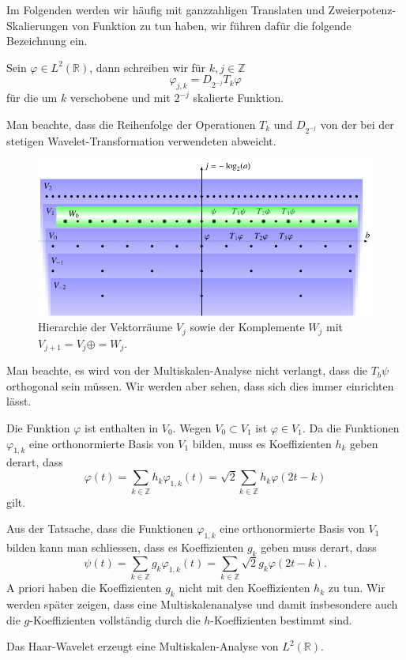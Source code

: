 Im Folgenden werden wir häufig mit ganzzahligen Translaten und
Zweierpotenz-Skalierungen von Funktion zu tun haben, wir führen dafür
die folgende Bezeichnung ein.

\begin{definition}
Sein $\varphi\in L^2(\mathbb R)$, dann schreiben wir für $k,j\in \mathbb Z$
\[
\varphi_{j,k} = D_{2^{-j}}T_k\varphi
\]
für die um $k$ verschobene und mit $2^{-j}$ skalierte Funktion.
\end{definition}

Man beachte, dass die Reihenfolge der Operationen $T_k$ und $D_{2^{-j}}$
von der bei der stetigen Wavelet-Transformation verwendeten abweicht.

\begin{figure}
\centering
\includegraphics{chapters/6-msa/images/msa.pdf}
\caption{Hierarchie der Vektorräume $V_j$ sowie der Komplemente $W_j$
mit
$V_{j+1} = V_j \oplus = W_j$.
\label{msa:vektorraumhierarchie}}
\end{figure}

Man beachte, es wird von der Multiskalen-Analyse nicht verlangt, dass 
die $T_b\psi$ orthogonal sein müssen.
Wir werden aber sehen, dass sich dies immer einrichten lässt.

Die Funktion $\varphi$ ist enthalten in $V_0$.
Wegen $V_0\subset V_1$ ist $\varphi\in V_1$.
Da die Funktionen $\varphi_{1,k}$ eine orthonormierte Basis von $V_1$
bilden, muss es Koeffizienten $h_k$ geben derart, dass
\begin{equation}
\varphi(t) = \sum_{k\in\mathbb Z} h_k\varphi_{1,k}(t)
=
\sqrt{2}\sum_{k\in\mathbb Z}h_k\varphi(2t-k)
\label{msa:skalrel-h}
\end{equation}
gilt.

Aus der Tatsache, dass die Funktionen $\varphi_{1,k}$ eine orthonormierte
Basis von $V_1$ bilden kann man schliessen, dass es Koeffizienten $g_k$
geben muss derart, dass
\begin{equation}
\psi(t)
=
\sum_{k\in\mathbb Z} g_k\varphi_{1,k}(t)
=
\sum_{k\in\mathbb Z}\sqrt{2}g_k \varphi(2t-k).
\label{msa:skalrel-g}
\end{equation}
A priori haben die Koeffizienten $g_k$ nicht mit den Koeffizienten $h_k$
zu tun.
Wir werden später zeigen, dass eine Multiskalenanalyse und damit
insbesondere auch die $g$-Koeffizienten vollständig durch
die $h$-Koeffizienten bestimmt sind.

\begin{beispiel}
Das Haar-Wavelet erzeugt eine Multiskalen-Analyse von $L^2(\mathbb R)$.
\end{beispiel}

